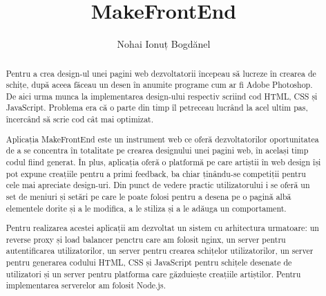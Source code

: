 \documentclass[a4paper]{article}
\title{MakeFrontEnd}
\author{Nohai Ionuț Bogdănel}
\begin{document}
\maketitle

\begin{abstract}
Pentru a crea design-ul unei pagini web dezvoltatorii începeau să lucreze în crearea de schițe, după aceea făceau un desen în anumite programe cum ar fi Adobe Photoshop. De aici urma munca la implementarea design-ului respectiv scriind cod HTML, CSS și JavaScript. Problema era că o parte din timp îl petreceau lucrând la acel ultim pas, încercând să scrie cod cât mai optimizat.  

Aplicația MakeFrontEnd este un instrument web ce oferă dezvoltatorilor oportunitatea de a se concentra în totalitate pe crearea designului unei pagini web, în același timp codul fiind generat. În plus, aplicația oferă o platformă pe care artiștii în web design își pot expune creațiile pentru a primi feedback, ba chiar ținându-se competiții pentru cele mai apreciate design-uri. Din punct de vedere practic utilizatorului i se oferă un set de meniuri și setări pe care le poate folosi pentru a desena pe o pagină albă elementele dorite și a le modifica, a le stiliza și a le adăuga un comportament.  

Pentru realizarea acestei aplicații am dezvoltat un sistem cu arhitectura urmatoare:  un reverse proxy și load balancer penctru care am folosit nginx, un server pentru autentificarea utilizatorilor, un server pentru crearea schițelor utilizatorilor, un server pentru  generarea  codului HTML, CSS și JavaScript pentru schițele desenate de utilizatori și  un server pentru platforma care găzduiește creațiile artiștilor. Pentru implementarea serverelor am folosit Node.js. 


\end{abstract}
\end{document}
